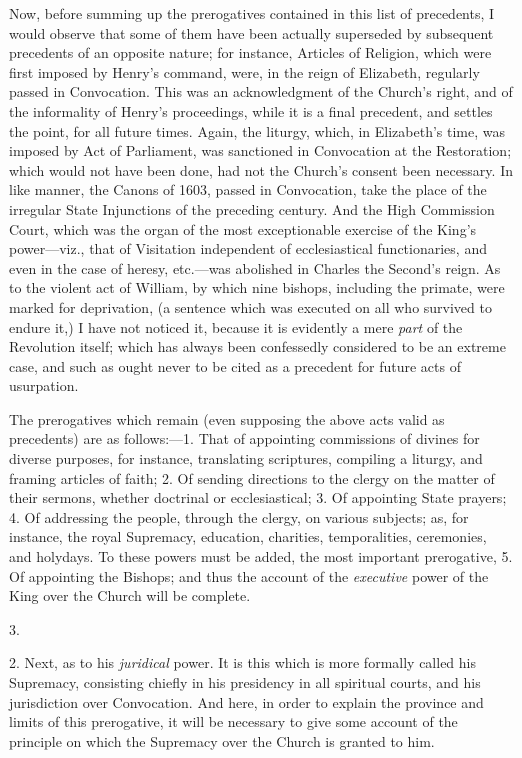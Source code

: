 Now, before summing up the
prerogatives contained in this list of precedents, I would observe
that some of them have been actually superseded by subsequent
precedents of an opposite nature; for instance, Articles of Religion,
which were first imposed by Henry's command, were, in the reign of
Elizabeth, regularly passed in Convocation. This was an acknowledgment
of the Church's right, and of the informality of Henry's proceedings,
while it is a final precedent, and settles the point, for all future
times. Again, the liturgy, which, in Elizabeth's time, was imposed by
Act of Parliament, was sanctioned in Convocation at the Restoration;
which would not have been done, had not the Church's consent been
necessary. In like manner, the Canons of 1603, passed in Convocation,
take the place of the irregular State Injunctions of the preceding century. And the High Commission Court, which was the organ
of the most exceptionable exercise of the King's power—viz., that of
Visitation independent of ecclesiastical functionaries, and even in
the case of heresy, etc.—was abolished in Charles the Second's
reign. As to the violent act of William, by which nine bishops,
including the primate, were marked for deprivation, (a sentence which
was executed on all who survived to endure it,) I have not noticed it,
because it is evidently a mere \emph{part} of the Revolution itself;
which has always been confessedly considered to be an extreme case,
and such as ought never to be cited as a precedent for future acts of
usurpation.

The prerogatives which remain
(even supposing the above acts valid as precedents) are as
follows:—1. That of appointing commissions of divines for diverse
purposes, for instance, translating scriptures, compiling a liturgy,
and framing articles of faith; 2. Of sending directions to the clergy
on the matter of their sermons, whether doctrinal or ecclesiastical;
3. Of appointing State prayers; 4. Of addressing the people, through
the clergy, on various subjects; as, for instance, the royal
Supremacy, education, charities, temporalities, ceremonies, and
holydays. To these powers must be added, the most important
prerogative, 5. Of appointing the Bishops; and thus the account of the
\emph{executive} power of the King over the Church will be complete.

3.

2. Next, as to his \emph{juridical}
power. It is this which is more formally called his Supremacy,
consisting chiefly in his presidency in all spiritual courts, and his
jurisdiction over Convocation. And here, in order to explain the
province and limits of this prerogative, it will be necessary to
give some account of the principle on which the Supremacy over the
Church is granted to him.

